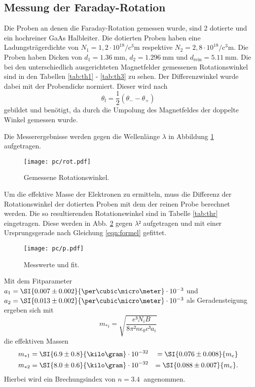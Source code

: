 \subsection{Messung der Faraday-Rotation}
Die Proben an denen die Faraday-Rotation gemessen wurde, sind 2 dotierte und ein hochreiner GaAs Halbleiter.
Die dotierten Proben haben eine Ladungsträgerdichte von $N_1 =  1{,}2 \cdot 10^{18} \si{\per\cubic\centi\meter}$ respektive $N_2 = 2{,}8 \cdot 10^{18} \si{\per\cubic\centi\meter}$.
Die Proben haben Dicken von $d_1 = \SI{1.36}{\milli\meter}$, $d_2 = \SI{1.296}{\milli\meter}$ und $d_\text{rein} = \SI{5.11}{\milli\meter}$.
Die bei den unterschiedlich ausgerichteten Magnetfelder gemessenen Rotationswinkel sind in den Tabellen \ref{tab:th1} - \ref{tab:th3} zu sehen.
Der Differenzwinkel wurde dabei mit der Probendicke normiert.
Dieser wird nach 
\begin{equation}
	\theta_\text{f} = \frac{1}{2}(\theta_- -\theta_+)
\end{equation}
gebildet und benötigt, da durch die Umpolung des Magnetfeldes der doppelte Winkel gemessen wurde.



Die Messerergebnisse werden gegen die Wellenlänge $\lambda$ in Abbildung \ref{fig:rot} aufgetragen.
\begin{figure}
	\centering
	\texttt{[image: pc/rot.pdf]}
	\caption{Gemessene Rotationswinkel.}
	\label{fig:rot}
\end{figure}
Um die effektive Masse der Elektronen zu ermitteln, muss die Differenz der Rotationswinkel der dotierten Proben mit dem der reinen Probe berechnet werden. Die so resultierenden Rotationswinkel sind in Tabelle \ref{tab:thr} eingetragen.
Diese werden in Abb. \ref{fig:p} gegen $\lambda²$ aufgetragen und mit einer Ursprungsgerade nach Gleichung \eqref{eqn:formel} gefittet.
\begin{figure}
	\centering
	\texttt{[image: pc/p.pdf]}
	\caption{Messwerte und fit.}
	\label{fig:p}
\end{figure}
Mit dem Fitparameter $a_1 = \SI{0.007\pm0.002}{\per\cubic\micro\meter}\cdot 10^{-3}$ und $a_2 = \SI{0.013\pm0.002}{\per\cubic\micro\meter}\cdot10^{-3}$ als Geradensteigung ergeben sich mit
\begin{equation}
	m_{*i} = \sqrt{\frac{e³N_i B}{8\pi² n \epsilon_0 c³ a_i}}
\end{equation}
die effektiven Massen
\begin{align}
	m_{*1} &= \SI{6.9\pm0.8}{\kilo\gram}\cdot10^{-32} &= \SI{0.076\pm0.008}{m_e}\\
	m_{*2} &= \SI{8.0\pm0.6}{\kilo\gram}\cdot10^{-32} &= \SI{0.088\pm0.007}{m_e}\text.
\end{align}
Hierbei wird ein Brechungsindex von $n=\SI{3.4}{}$ angenommen.


